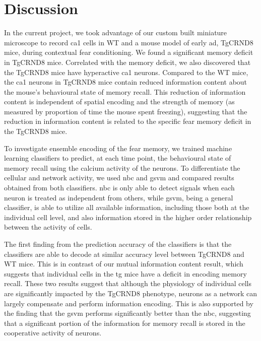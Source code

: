 \section{Discussion}


In the current project, we took advantage of our custom built miniature microscope to record \gls{ca1} cells in WT and a mouse model of early \gls{ad}, TgCRND8 mice, during contextual fear conditioning. We found a significant memory deficit in TgCRND8 mice. Correlated with the memory deficit, we also discovered that the TgCRND8 mice have hyperactive \gls{ca1} neurons. Compared to the WT mice, the \gls{ca1} neurons in TgCRND8 mice contain reduced information content about the mouse's behavioural state of memory recall. This reduction of information content is independent of spatial encoding and the strength of memory (as measured by proportion of time the mouse spent freezing), suggesting that the reduction in information content is related to the specific fear memory deficit in the TgCRND8 mice.

To investigate ensemble encoding of the fear memory, we trained machine learning classifiers to predict, at each time point, the behavioural state of memory recall using the calcium activity of the neurons. To differentiate the cellular and network activity, we used \gls{nbc} and \gls{gsvm} and compared results obtained from both classifiers. \Gls{nbc} is only able to detect signals when each neuron is treated as independent from others, while \gls{gsvm}, being a general classifier, is able to utilize all available information, including those both at the individual cell level, and also information stored in the higher order relationship between the activity of cells. 

The first finding from the prediction accuracy of the classifiers is that the classifiers are able to decode at similar accuracy level between TgCRND8 and WT mice. This is in contrast of our mutual information content result, which suggests that individual cells in the \gls{tg} mice have a deficit in encoding memory recall. These two results suggest that although the physiology of individual cells are significantly impacted by the TgCRND8 phenotype, neurons as a network can largely compensate and perform information encoding. This is also supported by the finding that the \gls{gsvm} performs significantly better than the \gls{nbc}, suggesting that a significant portion of the information for memory recall is stored in the cooperative activity of neurons. 

